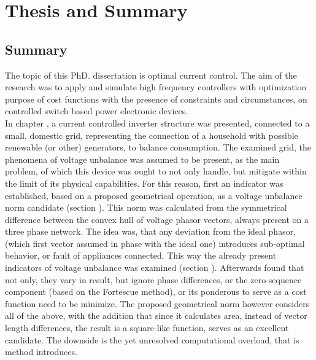 \chapter{Thesis and Summary}

\section{Summary}

The topic of this PhD. dissertation is optimal current control. The aim of the research was to apply and simulate high frequency controllers with optimization purpose of cost functions with the presence of constraints and circumstances, on controlled switch based power electronic devices.\\
In chapter , a current controlled inverter structure was presented, connected to a small, domestic grid, representing the connection of a household with possible renewable (or other) generators, to balance consumption. The examined grid, the phenomena of voltage unbalance was assumed to be present, as the main problem, of which this device was ought to not only handle, but mitigate within the limit of its physical capabilities. For this reason, first an indicator was established, based on a proposed geometrical operation, as a voltage unbalance norm candidate (section ). This norm was calculated from the symmetrical difference between the convex hull of voltage phasor vectors, always present on a three phase network. The idea was, that any deviation from the ideal phasor, (which first vector assumed in phase with the ideal one) introduces sub-optimal behavior, or fault of appliances connected. This way the already present indicators of voltage unbalance was examined (section ). Afterwards found that not only, they vary in result, but ignore phase differences, or the zero-sequence component (based on the Fortescue method), or its ponderous to serve as a cost function need to be minimize. The proposed geometrical norm however considers all of the above, with the addition that since it calculates area, instead of vector length differences, the result is a square-like function, serves as an excellent candidate. The downside is the yet unresolved computational overload, that is method introduces.\\
